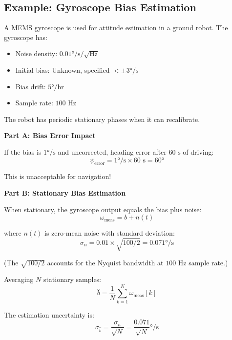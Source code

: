 \subsection{Example: Gyroscope Bias Estimation}
\label{ex:gyro_bias}

\begin{example}

A MEMS gyroscope is used for attitude estimation in a ground robot. The gyroscope has:
\begin{itemize}
    \item Noise density: $0.01°/\text{s}/\sqrt{\text{Hz}}$
    \item Initial bias: Unknown, specified $<\pm 3°/\text{s}$
    \item Bias drift: $5°/\text{hr}$
    \item Sample rate: $100\text{ Hz}$
\end{itemize}

The robot has periodic stationary phases when it can recalibrate.

\textbf{Part A: Bias Error Impact}

If the bias is $1°/\text{s}$ and uncorrected, heading error after $60\text{ s}$ of driving:
\begin{equation}
\psi_{\text{error}} = 1°/\text{s} \times 60\text{ s} = 60°
\end{equation}

This is unacceptable for navigation!

\textbf{Part B: Stationary Bias Estimation}

When stationary, the gyroscope output equals the bias plus noise:
\begin{equation}
\omega_{\text{meas}} = b + n(t)
\end{equation}

where $n(t)$ is zero-mean noise with standard deviation:
\begin{equation}
\sigma_n = 0.01 \times \sqrt{100/2} = 0.071°/\text{s}
\end{equation}

(The $\sqrt{100/2}$ accounts for the Nyquist bandwidth at $100\text{ Hz}$ sample rate.)

Averaging $N$ stationary samples:
\begin{equation}
\hat{b} = \frac{1}{N}\sum_{k=1}^{N} \omega_{\text{meas}}[k]
\end{equation}

The estimation uncertainty is:
\begin{equation}
\sigma_{\hat{b}} = \frac{\sigma_n}{\sqrt{N}} = \frac{0.071}{\sqrt{N}}°/\text{s}
\end{equation}


\end{example}
